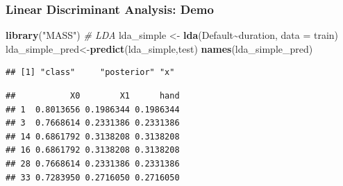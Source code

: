 \documentclass[
  shownotes,
  xcolor={svgnames},
  hyperref={colorlinks,citecolor=DarkBlue,linkcolor=DarkRed,urlcolor=DarkBlue}
  , aspectratio=169]{beamer}
\newenvironment{Shaded}{\begin{snugshade}}{\end{snugshade}}
\newcommand{\CommentTok}[1]{\textcolor[rgb]{0.56,0.35,0.01}{\textit{#1}}}
\newcommand{\DataTypeTok}[1]{\textcolor[rgb]{0.13,0.29,0.53}{#1}}
\newcommand{\DecValTok}[1]{\textcolor[rgb]{0.00,0.00,0.81}{#1}}
\newcommand{\KeywordTok}[1]{\textcolor[rgb]{0.13,0.29,0.53}{\textbf{#1}}}
\newcommand{\NormalTok}[1]{#1}
\newcommand{\OperatorTok}[1]{\textcolor[rgb]{0.81,0.36,0.00}{\textbf{#1}}}
\newcommand{\StringTok}[1]{\textcolor[rgb]{0.31,0.60,0.02}{#1}}
\begin{document}
\begin{frame}[fragile]
\frametitle{Linear Discriminant Analysis: Demo}
\begin{scriptsize}


\begin{Shaded}
\begin{Highlighting}[]
\KeywordTok{library}\NormalTok{(}\StringTok{"MASS"}\NormalTok{)     }\CommentTok{\# LDA}
\NormalTok{lda\_simple \textless{}{-}}\StringTok{ }\KeywordTok{lda}\NormalTok{(Default}\OperatorTok{\textasciitilde{}}\NormalTok{duration, }\DataTypeTok{data =}\NormalTok{ train)}
\NormalTok{lda\_simple\_pred\textless{}{-}}\KeywordTok{predict}\NormalTok{(lda\_simple,test)}
\KeywordTok{names}\NormalTok{(lda\_simple\_pred)}
\end{Highlighting}
\end{Shaded}
\end{scriptsize}
\begin{tiny}
\begin{verbatim}
## [1] "class"     "posterior" "x"
\end{verbatim}
\end{tiny}


\begin{scriptsize}
\begin{Shaded}
\end{Shaded}



\begin{verbatim}
##           X0        X1      hand
## 1  0.8013656 0.1986344 0.1986344
## 3  0.7668614 0.2331386 0.2331386
## 14 0.6861792 0.3138208 0.3138208
## 16 0.6861792 0.3138208 0.3138208
## 28 0.7668614 0.2331386 0.2331386
## 33 0.7283950 0.2716050 0.2716050
\end{verbatim}
\end{scriptsize}
\end{frame}
\end{document}
